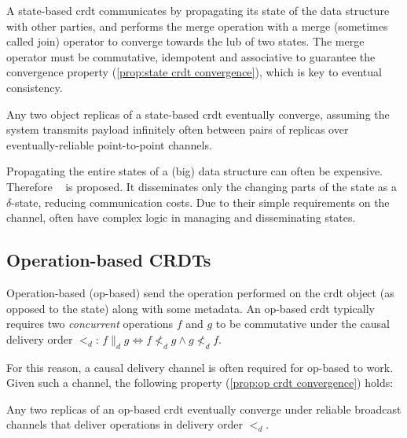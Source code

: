 A state-based \acrshort{crdt} communicates by propagating its state of 
the data structure with other parties, and performs the merge operation with a merge
(sometimes called join) operator to converge towards the \acrfull{lub} of
two states. The merge operator must be commutative, idempotent and
associative to guarantee the convergence property (\cref{prop:state crdt convergence}),
which is key to eventual consistency.

\begin{proposition} \label{prop:state crdt convergence}
  Any two object replicas of a state-based \acrshort{crdt} eventually converge, 
  assuming the system transmits payload infinitely often between pairs of replicas over
  eventually-reliable point-to-point channels.
\end{proposition}

Propagating the entire states of a (big) data structure can often be expensive.
Therefore ~\cite{almeida2018DeltaCRDT} is proposed. It
disseminates only the changing parts of the state as 
a \(\delta\)-state, reducing communication costs.
Due to their simple requirements on the channel,  often
have complex logic in managing and disseminating states.


\subsection{Operation-based CRDTs} \label{subsec:bg op-based crdts}

Operation-based (op-based)  send the operation performed on 
the \acrshort{crdt} object (as opposed to the state) along with some metadata.
An op-based \acrshort{crdt} typically requires two \emph{concurrent}
operations \(f\) and \(g\) to 
be commutative under the causal delivery order \(<_d\): 
\(f \parallel_d g \iff f\not <_d g \land g\not <_d f\). 

For this reason, a causal delivery channel is often required for op-based
 to work. Given such a channel, the following 
property (\cref{prop:op crdt convergence}) holds:

\begin{proposition} \label{prop:op crdt convergence}
  Any two replicas of an op-based \acrshort{crdt} eventually converge under reliable broadcast
  channels that deliver operations in delivery order \(<_d\).
\end{proposition}

